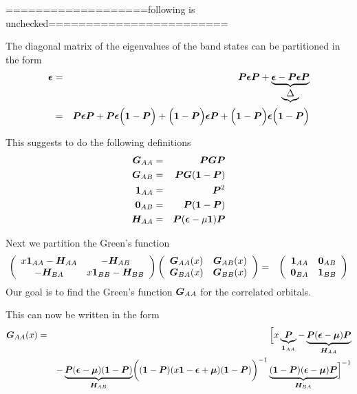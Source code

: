 \documentclass[11pt,a4paper]{report}
\begin{document}
===================following is unchecked========================



The diagonal matrix of the eigenvalues of the band states can be
partitioned in the form
\begin{eqnarray}
\bm{\epsilon}&=&\bm{P}\bm{\epsilon}\bm{P}+
\underbrace{\bm{\epsilon}-\bm{P}\bm{\epsilon}\bm{P}}_{\underbrace{\Delta}}
\nonumber\\
&=&
\bm{P}\bm{\epsilon}\bm{P}
+\bm{P}\bm{\epsilon}\Bigl(\bm{1}-\bm{P}\Bigr)
+\Bigl(\bm{1}-\bm{P}\Bigr)\bm{\epsilon}\bm{P}
+\Bigl(\bm{1}-\bm{P}\Bigr)\bm{\epsilon}\Bigl(\bm{1}-\bm{P}\Bigr)
\end{eqnarray}

This suggests to do the following definitions
\begin{eqnarray}
\bm{G}_{AA}&=&\bm{P}\bm{G}\bm{P}
\nonumber\\
\bm{G}_{AB}&=&\bm{P}\bm{G}(\bm{1}-\bm{P})
\nonumber\\
\bm{1}_{AA}&=& \bm{P}^2
\nonumber\\
\bm{0}_{AB}&=& \bm{P}(\bm{1}-\bm{P})
\nonumber\\
\bm{H}_{AA}&=& \bm{P}(\bm{\epsilon}-\mu\bm{1})\bm{P}
\end{eqnarray}


Next we partition the Green's function
\begin{eqnarray}
\left(\begin{array}{cc}
x\bm{1}_{AA}-\bm{H}_{AA}&-\bm{H}_{AB}\\
-\bm{H}_{BA}&x\bm{1}_{BB}-\bm{H}_{BB}
\end{array}\right)
\left(\begin{array}{cc}
\bm{G}_{AA}(x)&\bm{G}_{AB}(x)\\
\bm{G}_{BA}(x)&\bm{G}_{BB}(x)
\end{array}\right)
&=&
\left(\begin{array}{cc}
\bm{1}_{AA}&\bm{0}_{AB}\\
\bm{0}_{BA}&\bm{1}_{BB}
\end{array}\right)
\end{eqnarray}
Our goal is to find the Green's function $\bm{G}_{AA}$ for the
correlated orbitals.


This can now be written in the form
\begin{eqnarray}
\bm{G}_{AA}(x)&=&
\Bigl[x\underbrace{\bm{P}}_{\bm{1}_{AA}}-
\underbrace{\bm{P}(\bm{\epsilon}-\bm{\mu})\bm{P}}_{\bm{H}_{AA}}
\nonumber\\
&&-\underbrace{\bm{P}(\bm{\epsilon}-\bm{\mu})(\bm{1}-\bm{P})}_{\bm{H}_{AB}}
\biggl((\bm{1}-\bm{P})(x\bm{1}-\bm{\epsilon}+\bm{\mu})(\bm{1}-\bm{P})
\biggr)^{-1}
\underbrace{(\bm{1}-\bm{P})
(\bm{\epsilon}-\bm{\mu})\bm{P}}_{\bm{H}_{BA}}
\Bigr]^{-1}
\end{eqnarray}
\end{document}
